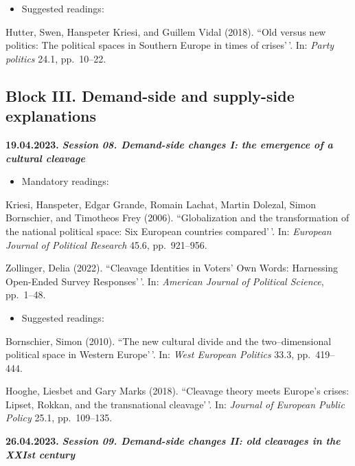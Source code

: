 \documentclass[
  12pt,
]{article}
\providecommand{\tightlist}{%
  \setlength{\itemsep}{0pt}\setlength{\parskip}{0pt}}
\begin{document}
\begin{itemize}
\tightlist
\item
  Suggested readings:
\end{itemize}

Hutter, Swen, Hanspeter Kriesi, and Guillem Vidal (2018). ``Old versus
new politics: The political spaces in Southern Europe in times of
crises'\,'. In: \emph{Party politics} 24.1, pp.~10--22.

\hypertarget{block-iii.-demand-side-and-supply-side-explanations}{%
\subsection{Block III. Demand-side and supply-side
explanations}\label{block-iii.-demand-side-and-supply-side-explanations}}

\textbf{19.04.2023.} \textbf{\emph{Session 08. Demand-side changes I:
the emergence of a cultural cleavage}}

\begin{itemize}
\tightlist
\item
  Mandatory readings:
\end{itemize}

Kriesi, Hanspeter, Edgar Grande, Romain Lachat, Martin Dolezal, Simon
Bornschier, and Timotheos Frey (2006). ``Globalization and the
transformation of the national political space: Six European countries
compared'\,'. In: \emph{European Journal of Political Research} 45.6,
pp.~921--956.

Zollinger, Delia (2022). ``Cleavage Identities in Voters' Own Words:
Harnessing Open-Ended Survey Responses'\,'. In:
\emph{American Journal of Political Science}, pp.~1--48.

\begin{itemize}
\tightlist
\item
  Suggested readings:
\end{itemize}

Bornschier, Simon (2010). ``The new cultural divide and the
two--dimensional political space in Western Europe'\,'. In:
\emph{West European Politics} 33.3, pp.~419--444.

Hooghe, Liesbet and Gary Marks (2018). ``Cleavage theory meets Europe's
crises: Lipset, Rokkan, and the transnational cleavage'\,'. In:
\emph{Journal of European Public Policy} 25.1, pp.~109--135.

\textbf{26.04.2023.} \textbf{\emph{Session 09. Demand-side changes II:
old cleavages in the XXIst century}}
\end{document}
